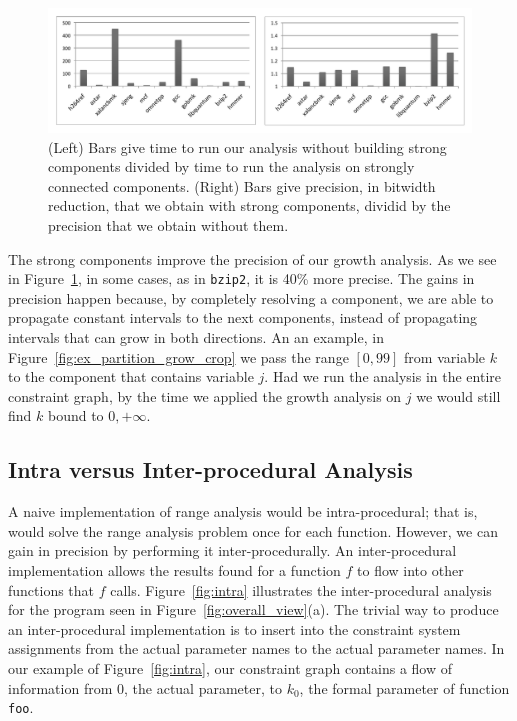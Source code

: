 \documentclass{paper}
\begin{document}
\begin{figure}[t!]
\begin{center}
\includegraphics[width=\textwidth]{images/impactSCC}
\end{center}
\caption{\label{fig:impactSCC}
(Left) Bars give time to run our analysis without building strong components
divided by time to run the analysis on strongly connected components.
(Right) Bars give precision, in bitwidth reduction, that we obtain with strong
components, dividid by the precision that we obtain without them.
}
\end{figure}

The strong components improve the precision of our growth analysis.
As we see in Figure~\ref{fig:impactSCC}, in some cases, as in \texttt{bzip2},
it is 40\% more precise.
The gains in precision happen because, by completely resolving a component,
we are able to propagate constant intervals to the next components, instead
of propagating intervals that can grow in both directions.
An an example, in Figure~\ref{fig:ex_partition_grow_crop} we pass the range
$[0, 99]$ from variable $k$ to the component that contains variable $j$.
Had we run the analysis in the entire constraint graph, by the time we
applied the growth analysis on $j$ we would still find $k$ bound to
$0, +\infty$.

\subsection{Intra versus Inter-procedural Analysis}
\label{sub:whole}

A naive implementation of range analysis would be intra-procedural; that is,
would solve the range analysis problem once for each function.
However, we can gain in precision by performing it inter-procedurally.
An inter-procedural implementation allows the results found for a function $f$
to flow into other functions that $f$ calls.
Figure~\ref{fig:intra} illustrates the inter-procedural analysis for the
program seen in Figure~\ref{fig:overall_view}(a).
The trivial way to produce an inter-procedural implementation is to insert
into the constraint system assignments from the actual parameter names to the
actual parameter names.
In our example of Figure~\ref{fig:intra}, our constraint graph contains a flow
of information from $0$, the actual parameter, to $k_0$, the formal parameter
of function \texttt{foo}.
\end{document}
